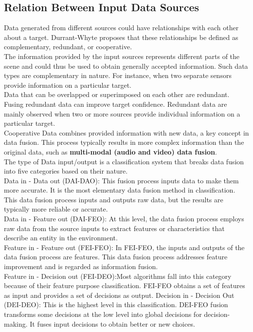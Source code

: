 \subsection{Relation Between Input Data Sources}
Data generated from different sources could have relationships with each other about a target. Durrant-Whyte proposes that these relationships be defined as complementary, redundant, or cooperative.\\ 
The information provided by the input sources represents different parts of the scene and could thus be used to obtain generally accepted information. Such data types are complementary in nature. For instance, when two separate sensors provide information on a particular target.\\
Data that can be overlapped or superimposed on each other are redundant. Fusing redundant data can improve target confidence. Redundant data are mainly observed when two or more sources provide individual information on a particular target.\\
Cooperative Data combines provided information with new data, a key concept in data fusion. This process typically results in more complex information than the original data, such as \textbf{multi-modal (audio and video) data fusion}.\\
The type of Data input/output is a classification system that breaks data fusion into five categories based on their nature.\\
Data in - Data out (DAI-DAO):
This fusion process inputs data to make them more accurate. It is the most elementary data fusion method in classification. This data fusion process inputs and outputs raw data, but the results are typically more reliable or accurate.\\

Data in - Feature out (DAI-FEO):
At this level, the data fusion process employs raw data from the source inputs to extract features or characteristics that describe an entity in the environment.\\
Feature in - Feature out (FEI-FEO):
    In FEI-FEO, the inputs and outputs of the data fusion process are features. This data fusion process addresses feature improvement and is regarded as information fusion.\\
Feature in - Decision out (FEI-DEO):Most algorithms fall into this category because of their feature purpose classification. FEI-FEO obtains a set of features as input and provides a set of decisions as output.
Decision in - Decision Out (DEI-DEO): This is the highest level in this classification. DEI-FEO fusion transforms some decisions at the low level into global decisions for decision-making. It fuses input decisions to obtain better or new choices. 

